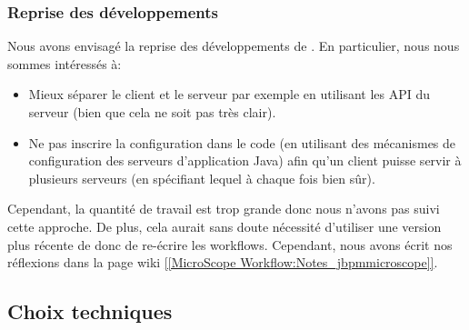\subsubsection{Reprise des développements}

Nous avons envisagé la reprise des développements de .
En particulier, nous nous sommes intéressés à:
\begin{itemize}
    \item Mieux séparer le client et le serveur par exemple en utilisant les API du serveur (bien que cela ne soit pas très clair).
    \item Ne pas inscrire la configuration dans le code (en utilisant des mécanismes de configuration des serveurs d'application Java)
          afin qu'un client puisse servir à plusieurs serveurs (en spécifiant lequel à chaque fois bien sûr).
\end{itemize}

Cependant, la quantité de travail est trop grande donc nous n'avons pas suivi cette approche.
De plus, cela aurait sans doute nécessité d'utiliser une version plus récente de 
donc de re-écrire les workflows.
Cependant, nous avons écrit nos réflexions dans la page wiki \href{https://intranet.genoscope.cns.fr/agc/redmine/projects/microscopeworkflow/wiki/Notes_jbpmmicroscope}{[[MicroScope Workflow:Notes\_jbpmmicroscope]]}.

\subsection{Choix techniques}

